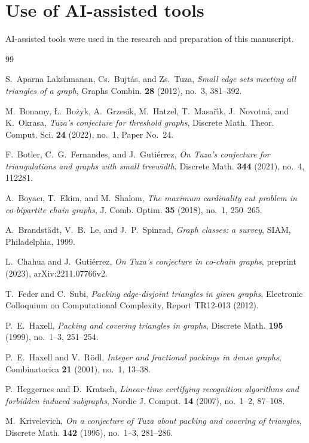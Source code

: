 \documentclass{amsart}
\theoremstyle{definition}
\numberwithin{equation}{section}
\numberwithin{table}{section}
\begin{document}
\section*{Use of AI-assisted tools}

AI-assisted tools were used in the research and preparation of this manuscript.

\begin{thebibliography}{99}

S.~Aparna Lakshmanan, Cs.~Bujt\'as, and Zs.~Tuza, \emph{Small edge sets meeting all triangles of a graph}, Graphs Combin. \textbf{28} (2012), no.~3, 381--392.

M.~Bonamy, \L.~Bo\.zyk, A.~Grzesik, M.~Hatzel, T.~Masa\v{r}\'{\i}k, J.~Novotn\'a, and K.~Okrasa, \emph{Tuza's conjecture for threshold graphs}, Discrete Math. Theor. Comput. Sci. \textbf{24} (2022), no.~1, Paper No.~24.

F.~Botler, C.~G.~Fernandes, and J.~Guti\'errez, \emph{On Tuza's conjecture for triangulations and graphs with small treewidth}, Discrete Math. \textbf{344} (2021), no.~4, 112281.

A.~Boyac\i, T.~Ekim, and M.~Shalom, \emph{The maximum cardinality cut problem in co-bipartite chain graphs}, J. Comb. Optim. \textbf{35} (2018), no.~1, 250--265.

A.~Brandst\"adt, V.~B.~Le, and J.~P.~Spinrad, \emph{Graph classes: a survey}, SIAM, Philadelphia, 1999.

L.~Chahua and J.~Guti\'errez, \emph{On Tuza's conjecture in co-chain graphs}, preprint (2023), arXiv:2211.07766v2.

T.~Feder and C.~Subi, \emph{Packing edge-disjoint triangles in given graphs}, Electronic Colloquium on Computational Complexity, Report TR12-013 (2012).

P.~E.~Haxell, \emph{Packing and covering triangles in graphs}, Discrete Math. \textbf{195} (1999), no.~1--3, 251--254.

P.~E.~Haxell and V.~R\"odl, \emph{Integer and fractional packings in dense graphs}, Combinatorica \textbf{21} (2001), no.~1, 13--38.

P.~Heggernes and D.~Kratsch, \emph{Linear-time certifying recognition algorithms and forbidden induced subgraphs}, Nordic J. Comput. \textbf{14} (2007), no.~1--2, 87--108.

M.~Krivelevich, \emph{On a conjecture of Tuza about packing and covering of triangles}, Discrete Math. \textbf{142} (1995), no.~1--3, 281--286.


\end{thebibliography}
\end{document}
